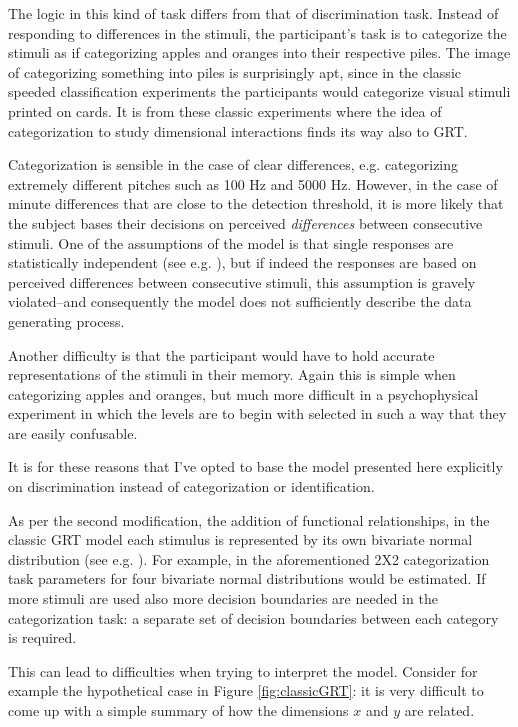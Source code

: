 \documentclass{article}\usepackage{knitr}
\begin{document}
The logic in this kind of task differs from that of discrimination task. Instead of responding to differences in the stimuli, the participant's task is to categorize the stimuli as if categorizing apples and oranges into their respective piles. The image of categorizing something into piles is surprisingly apt, since in the classic speeded classification experiments \citep{garner1974} the participants would categorize visual stimuli printed on cards. It is from these classic experiments where the idea of categorization to study dimensional interactions finds its way also to GRT. 

Categorization is sensible in the case of clear differences, e.g. categorizing extremely different pitches such as 100 Hz and 5000 Hz. However, in the case of minute differences that are close to the detection threshold, it is more likely that the subject bases their decisions on perceived \textit{differences} between consecutive stimuli. One of the assumptions of the model is that single responses are statistically independent (see e.g. \citet[p. 218]{wickens1992}), but if indeed the responses are based on perceived differences between consecutive stimuli, this assumption is gravely violated--and consequently the model does not sufficiently describe the data generating process. 

Another difficulty is that the participant would have to hold accurate representations of the stimuli in their memory. Again this is simple when categorizing apples and oranges, but much more difficult in a psychophysical experiment in which the levels are to begin with selected in such a way that they are easily confusable. 

It is for these reasons that I've opted to base the model presented here explicitly on discrimination instead of categorization or identification.

As per the second modification, the addition of functional relationships, in the classic GRT model each stimulus is represented by its own bivariate  normal distribution (see e.g. \cite{ashby2015}). For example, in the aforementioned 2X2 categorization task parameters for four bivariate normal distributions would be estimated. If more stimuli are used also more decision boundaries are needed in the categorization task: a separate set of decision boundaries between each category is required. 

This can lead to difficulties when trying to interpret the model. Consider for example the hypothetical case in Figure \ref{fig:classicGRT}: it is very difficult to come up with a simple summary of how the dimensions $x$ and $y$ are related.
\end{document}
